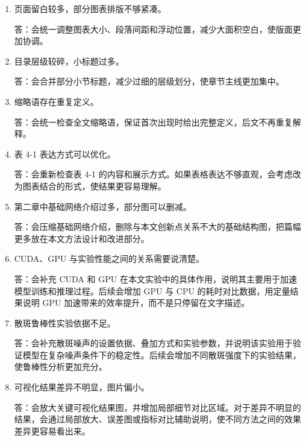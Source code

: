 \documentclass[UTF8,a4paper,12pt,fontset=fandol]{ctexart}
\begin{document}
\begin{enumerate}[leftmargin=2em,itemsep=1.1em]
\item 页面留白较多，部分图表排版不够紧凑。

答：会统一调整图表大小、段落间距和浮动位置，减少大面积空白，使版面更加协调。

\item 目录层级较碎，小标题过多。

答：会合并部分小节标题，减少过细的层级划分，使章节主线更加集中。

\item 缩略语存在重复定义。

答：会统一检查全文缩略语，保证首次出现时给出完整定义，后文不再重复解释。

\item 表 4-1 表达方式可以优化。

答：会重新检查表 4-1 的内容和展示方式。如果表格表达不够直观，会考虑改为图表结合的形式，使结果更容易理解。

\item 第二章中基础网络介绍过多，部分图可以删减。

答：会压缩基础网络介绍，删除与本文创新点关系不大的基础结构图，把篇幅更多放在本文方法设计和改进部分。

\item CUDA、GPU 与实验性能之间的关系需要说清楚。

答：会补充 CUDA 和 GPU 在本文实验中的具体作用，说明其主要用于加速模型训练和推理过程。后续会增加 GPU 与 CPU 的耗时对比数据，用定量结果说明 GPU 加速带来的效率提升，而不是只停留在文字描述。

\item 散斑鲁棒性实验依据不足。

答：会补充散斑噪声的设置依据、叠加方式和实验参数，并说明该实验用于验证模型在复杂噪声条件下的稳定性。后续会增加不同散斑强度下的实验结果，使鲁棒性分析更加充分。

\item 可视化结果差异不明显，图片偏小。

答：会放大关键可视化结果图，并增加局部细节对比区域。对于差异不明显的结果，会通过局部放大、误差图或指标对比辅助说明，使不同方法之间的效果差异更容易看出来。
\end{enumerate}
\end{document}
